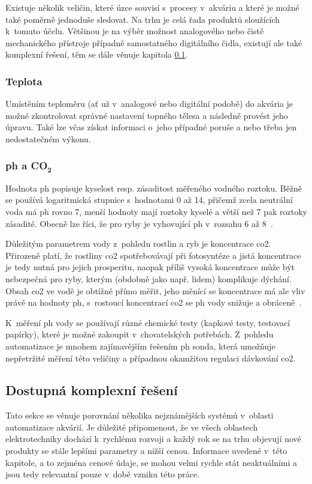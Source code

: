         Existuje několik veličin, které úzce souvisí s~procesy v~akváriu a které je možné také poměrně jednoduše sledovat. Na trhu je celá řada produktů sloužících k~tomuto účelu. Většinou je na výběr možnost analogového nebo čistě mechanického přístroje případně samostatného digitálního čidla, existují ale také komplexní řešení, těm se dále věnuje kapitola  \ref{lab:kapitola-komplexni-reseni}. 

        \subsubsection{Teplota}
            Umístěním teploměru (ať už v~analogové nebo digitální podobě) do akvária je možné zkontrolovat správné nastavení topného tělesa a následně provést jeho úpravu. Také lze včas získat informaci o~jeho případné poruše a nebo třeba jen nedostatečném výkonu. 
        \subsubsection{\acs{ph} a CO\(\mathbf{_{2}}\)}
            Hodnota \acs{ph} popisuje kyselost resp. zásaditost měřeného vodného roztoku. Běžně se používá logaritmická stupnice s~hodnotami 0 až 14, přičemž zcela neutrální voda má \acs{ph} rovno 7, menší hodnoty mají roztoky kyselé a větší než 7 pak roztoky zásadité.  Obecně lze říci, že pro ryby je vyhovující \acs{ph} v~rozsahu 6 až 8~\cite{slavotinek2014}. 

            Důležitým parametrem vody z~pohledu rostlin a ryb je koncentrace \acs{co2}. Přirozeně platí, že rostliny \acs{co2} spotřebovávají při fotosyntéze a jistá koncentrace je tedy nutná pro jejich prosperitu, naopak příliš vysoká koncentrace může být nebezpečná pro ryby, kterým (obdobně jako např. lidem) komplikuje dýchání. Obsah \acs{co2} ve vodě je obtížné přímo měřit, jeho měnící se koncentrace má ale vliv právě na hodnoty \acs{ph}, s~rostoucí koncentrací \acs{co2} se \acs{ph} vody snižuje a obráceně~\cite{DvorakJan2014RPpa,KejzlarRadim2022Ařpa}. 

            K~měření \acs{ph} vody se používají různé chemické testy (kapkové testy, testovací papírky), které je možné zakoupit v~chovatelských potřebách. Z~pohledu automatizace je mnohem zajímavějším řešením \acs{ph} sonda, která umožňuje nepřetržité měření této veličiny a případnou okamžitou regulaci dávkování \acs{co2}.

             
    \subsection{Dostupná komplexní řešení}
    \label{lab:kapitola-komplexni-reseni}
        Tato sekce se věnuje porovnání několika nejznámějších systémů v~oblasti automatizace akvárií. Je důležité připomenout, že ve všech oblastech elektrotechniky dochází k~rychlému rozvoji a každý rok se na trhu objevují nové produkty se stále lepšími parametry a nižší cenou. Informace uvedené v~této kapitole, a to zejména cenové údaje, se mohou velmi rychle stát neaktuálními a jsou tedy relevantní pouze v~době vzniku této práce.


